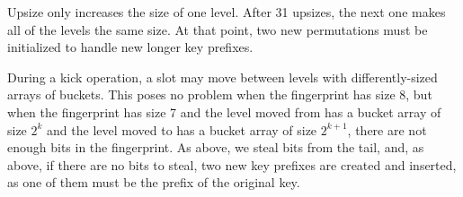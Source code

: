\documentclass[letterpaper, 11pt]{article}
\begin{document}
Upsize only increases the size of one level.
After 31 upsizes, the next one makes all of the levels the same size.
At that point, two new permutations must be initialized to handle new longer key prefixes.

During a kick operation, a slot may move between levels with differently-sized arrays of buckets.
This poses no problem when the fingerprint has size 8, but when the fingerprint has size 7 and the level moved from has a bucket array of size $2^k$ and the level moved to has a bucket array of size $2^{k+1}$,  there are not enough bits in the fingerprint.
As above, we steal bits from the tail, and, as above, if there are no bits to steal, two new key prefixes are created and inserted, as one of them must be the prefix of the original key.








\end{document}
